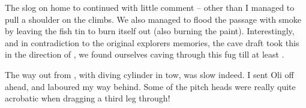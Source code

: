 The slog on home to  continued with little comment -- other
than I managed to pull a shoulder on the  climbs. We also
managed to flood the passage with smoke by leaving the fish tin to burn
itself out (also burning the paint). Interestingly, and in contradiction
to the original explorers memories, the cave draft took this in the
direction of , we found ourselves caving through this fug till
at least .

The way out from , with diving cylinder in tow, was slow
indeed. I sent Oli off ahead, and laboured my way behind. Some of the
 pitch heads were really quite acrobatic when dragging a
third leg through!




